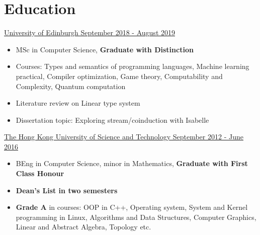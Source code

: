 \documentclass[a4paper,12pt]{article}
\begin{document}
  \section*{Education}
  \uline{University of Edinburgh \hfill September 2018 - August 2019}
  \begin{itemize}
    \item MSc in Computer Science, \textbf{Graduate with Distinction}
    \item Courses: Types and semantics of programming languages, Machine learning practical, Compiler optimization, Game theory, Computability and Complexity, Quantum computation
    \item Literature review on Linear type system
    \item Dissertation topic: Exploring stream/coinduction with Isabelle
    
  \end{itemize}
  \uline{The Hong Kong University of Science and Technology \hfill September 2012 - June 2016}
  \begin{itemize}
    \item BEng in Computer Science, minor in Mathematics, \textbf{Graduate with First Class Honour}
    \item \textbf{Dean's List in two semesters}
    \item \textbf{Grade A} in courses: OOP in C++, Operating system, System and Kernel programming in Linux, Algorithms and Data Structures, Computer Graphics, Linear and Abstract Algebra, Topology etc.
  \end{itemize}
\end{document}
